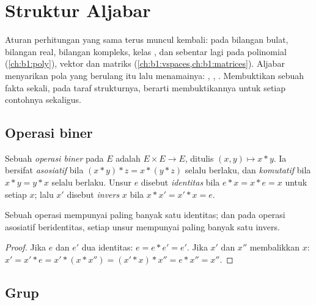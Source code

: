 \chapter{Struktur Aljabar}\label{ch:b1:structures}

Aturan perhitungan yang sama terus muncul kembali: pada bilangan bulat, bilangan real,
bilangan kompleks, kelas , dan sebentar lagi pada polinomial
(\cref{ch:b1:poly}), vektor dan matriks
(\cref{ch:b1:vspaces,ch:b1:matrices}). Aljabar menyarikan pola
yang berulang itu lalu menamainya: \emph{}, \emph{}, \emph{}.
Membuktikan sebuah fakta sekali, pada taraf strukturnya, berarti membuktikannya untuk
setiap contohnya sekaligus.

\section{Operasi biner}

\begin{definition}\label{def:b1:structures:law}
Sebuah \emph{operasi biner} pada  $E$ adalah
 $E \times E \to E$, ditulis $(x, y) \mapsto x * y$. Ia bersifat
\emph{asosiatif} bila $(x*y)*z = x*(y*z)$ selalu berlaku, dan \emph{komutatif}
bila $x * y = y * x$ selalu berlaku. Unsur $e$ disebut \emph{identitas} bila
$e * x = x * e = x$ untuk setiap $x$; lalu $x'$ disebut \emph{invers} $x$
bila $x * x' = x' * x = e$.
\end{definition}

\begin{proposition}[Ketunggalan]\label{prop:b1:structures:unique}
Sebuah operasi mempunyai paling banyak satu identitas; dan pada operasi asosiatif
beridentitas, setiap unsur mempunyai paling banyak satu invers.
\end{proposition}

\begin{proof}
Jika $e$ dan $e'$ dua identitas: $e = e * e' = e'$. Jika $x'$ dan $x''$
membalikkan $x$: $x' = x' * e = x' * (x * x'') = (x' * x) * x'' = e * x''
= x''$.
\end{proof}

\section{Grup}

